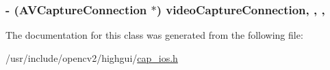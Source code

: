 \hypertarget{interfaceCvAbstractCamera_a1af316db920014c2b17c51de1abef07c}{
\subsubsection[{video\-Capture\-Connection}]{\setlength{\rightskip}{0pt plus 5cm}-\/ (A\-V\-Capture\-Connection $\ast$) video\-Capture\-Connection\hspace{0.3cm}{\ttfamily [read]}, {\ttfamily [write]}, {\ttfamily [nonatomic]}, {\ttfamily [retain]}}}\label{interfaceCvAbstractCamera_a1af316db920014c2b17c51de1abef07c}


The documentation for this class was generated from the following file\-:\begin{DoxyCompactItemize}
\item 
/usr/include/opencv2/highgui/\hyperlink{cap__ios_8h}{cap\-\_\-ios.\-h}\end{DoxyCompactItemize}
